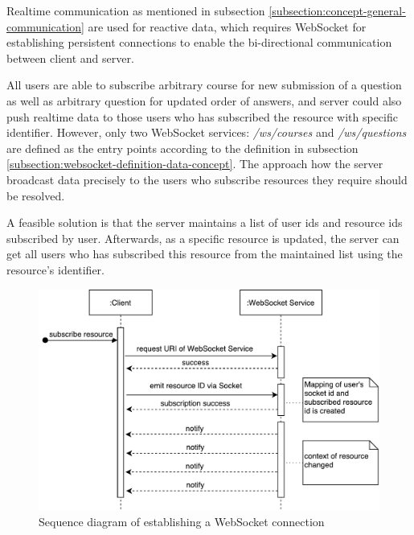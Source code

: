 
Realtime communication as mentioned in subsection \ref{subsection:concept-general-communication} are used for reactive data, which requires WebSocket for establishing persistent connections to enable the bi-directional communication between client and server.


All users are able to subscribe arbitrary course for new submission of a question as well as arbitrary question for updated order of answers, and server could also push realtime data to those users who has subscribed the resource with specific identifier. However, only two WebSocket services: \textit{/ws/courses} and \textit{/ws/questions} are defined as the entry points according to the definition in subsection \ref{subsection:websocket-definition-data-concept}. The approach how the server broadcast data precisely to the users who subscribe resources they require should be resolved.

A feasible solution is that the server maintains a list of user ids and resource ids subscribed by user. Afterwards, as a specific resource is updated, the server can get all users who has subscribed this resource from the maintained list using the resource's identifier.

\begin{figure}[!htbp]
  \centering
    \includegraphics[width=1\textwidth]{Figures/concept-websocket-connection-sequence.pdf}
  \caption{Sequence diagram of establishing a WebSocket connection}
  \label{fig:websocket-connection-sequence-concept}
\end{figure}

